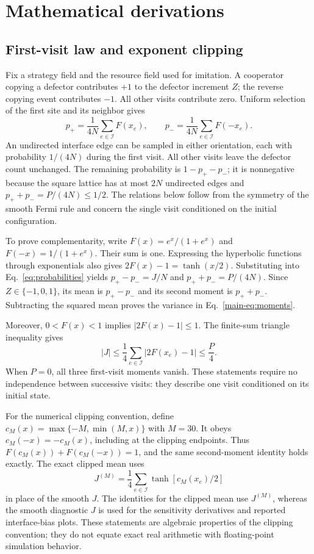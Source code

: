 \section{Mathematical derivations}
\label{sec:proofs}

\subsection{First-visit law and exponent clipping}

Fix a strategy field and the resource field used for imitation. A cooperator copying a defector contributes $+1$ to the defector increment $Z$; the reverse copying event contributes $-1$. All other visits contribute zero. Uniform selection of the first site and its neighbor gives
\begin{equation}
\label{eq:probabilities}
p_+=\frac{1}{4N}\sum_{e\in\mathcal I}F(x_e),
\qquad
p_-=\frac{1}{4N}\sum_{e\in\mathcal I}F(-x_e).
\end{equation}
An undirected interface edge can be sampled in either orientation, each with probability $1/(4N)$ during the first visit. All other visits leave the defector count unchanged. The remaining probability is $1-p_+-p_-$; it is nonnegative because the square lattice has at most $2N$ undirected edges and $p_++p_-=P/(4N)\le1/2$. The relations below follow from the symmetry of the smooth Fermi rule and concern the single visit conditioned on the initial configuration.

To prove complementarity, write $F(x)=e^x/(1+e^x)$ and $F(-x)=1/(1+e^x)$. Their sum is one. Expressing the hyperbolic functions through exponentials also gives $2F(x)-1=\tanh(x/2)$. Substituting into Eq.~\eqref{eq:probabilities} yields $p_+-p_-=J/N$ and $p_++p_-=P/(4N)$. Since $Z\in\{-1,0,1\}$, its mean is $p_+-p_-$ and its second moment is $p_++p_-$. Subtracting the squared mean proves the variance in Eq.~\eqref{main-eq:moments}.

Moreover, $0<F(x)<1$ implies $|2F(x)-1|\le1$. The finite-sum triangle inequality gives
\begin{equation}
\label{eq:drift_bound}
|J|\le\frac14\sum_{e\in\mathcal I}|2F(x_e)-1|
\le\frac P4.
\end{equation}
When $P=0$, all three first-visit moments vanish. These statements require no independence between successive visits: they describe one visit conditioned on its initial state.

For the numerical clipping convention, define $c_M(x)=\max\{-M,\min(M,x)\}$ with $M=30$. It obeys $c_M(-x)=-c_M(x)$, including at the clipping endpoints. Thus $F(c_M(x))+F(c_M(-x))=1$, and the same second-moment identity holds exactly. The exact clipped mean uses
\begin{equation}
\label{eq:clipped}
J^{(M)}=\frac14\sum_{e\in\mathcal I}
\tanh[c_M(x_e)/2]
\end{equation}
in place of the smooth $J$. The identities for the clipped mean use $J^{(M)}$, whereas the smooth diagnostic $J$ is used for the sensitivity derivatives and reported interface-bias plots. These statements are algebraic properties of the clipping convention; they do not equate exact real arithmetic with floating-point simulation behavior.

